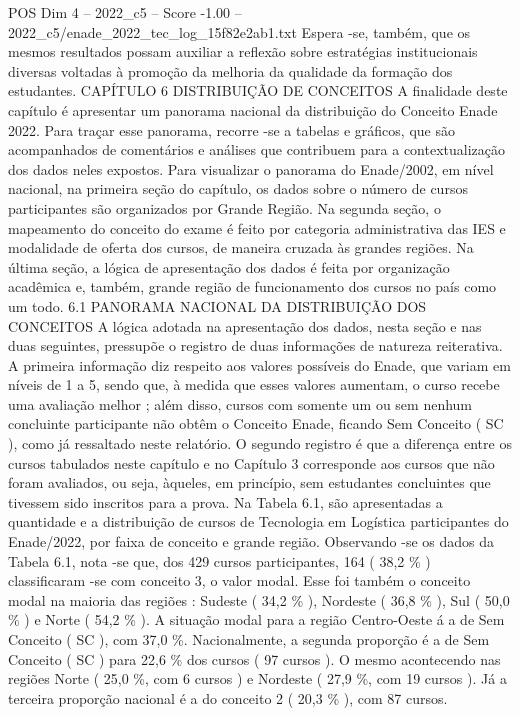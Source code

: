 \begin{textsample}{POS Dim 4 – 2022\_c5 – Score -1.00 – 2022\_c5/enade\_2022\_tec\_log\_15f82e2ab1.txt}
Espera -se, também, que os mesmos resultados possam auxiliar a reflexão sobre estratégias institucionais diversas voltadas à promoção da melhoria da qualidade da formação dos estudantes.
CAPÍTULO 6 DISTRIBUIÇÃO DE CONCEITOS A finalidade deste capítulo é apresentar um panorama nacional da distribuição do Conceito Enade 2022.
Para traçar esse panorama, recorre -se a tabelas e gráficos, que são acompanhados de comentários e análises que contribuem para a contextualização dos dados neles expostos.
Para visualizar o panorama do Enade/2002, em nível nacional, na primeira seção do capítulo, os dados sobre o número de cursos participantes são organizados por Grande Região.
Na segunda seção, o mapeamento do conceito do exame é feito por categoria administrativa das IES e modalidade de oferta dos cursos, de maneira cruzada às grandes regiões.
Na última seção, a lógica de apresentação dos dados é feita por organização acadêmica e, também, grande região de funcionamento dos cursos no país como um todo. 6.1 PANORAMA NACIONAL DA DISTRIBUIÇÃO DOS CONCEITOS A lógica adotada na apresentação dos dados, nesta seção e nas duas seguintes, pressupõe o registro de duas informações de natureza reiterativa.
A primeira informação diz respeito aos valores possíveis do Enade, que variam em níveis de 1 a 5, sendo que, à medida que esses valores aumentam, o curso recebe uma avaliação melhor ; além disso, cursos com somente um ou sem nenhum concluinte participante não obtêm o Conceito Enade, ficando Sem Conceito ( SC ), como já ressaltado neste relatório.
O segundo registro é que a diferença entre os cursos tabulados neste capítulo e no Capítulo 3 corresponde aos cursos que não foram avaliados, ou seja, àqueles, em princípio, sem estudantes concluintes que tivessem sido inscritos para a prova.
Na Tabela 6.1, são apresentadas a quantidade e a distribuição de cursos de Tecnologia em Logística participantes do Enade/2022, por faixa de conceito e grande região.
Observando -se os dados da Tabela 6.1, nota -se que, dos 429 cursos participantes, 164 ( 38,2 \% ) classificaram -se com conceito 3, o valor modal.
Esse foi também o conceito modal na maioria das regiões : Sudeste ( 34,2 \% ), Nordeste ( 36,8 \% ), Sul ( 50,0 \% ) e Norte ( 54,2 \% ).
A situação modal para a região Centro-Oeste á a de Sem Conceito ( SC ), com 37,0 \%.
Nacionalmente, a segunda proporção é a de Sem Conceito ( SC ) para 22,6 \% dos cursos ( 97 cursos ).
O mesmo acontecendo nas regiões Norte ( 25,0 \%, com 6 cursos ) e Nordeste ( 27,9 \%, com 19 cursos ).
Já a terceira proporção nacional é a do conceito 2 ( 20,3 \% ), com 87 cursos.

\end{textsample}
